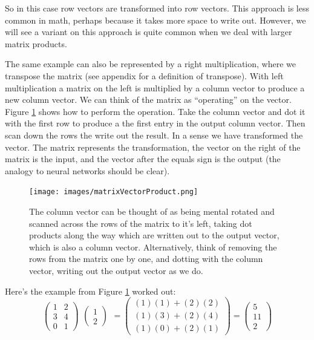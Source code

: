 So in this case row vectors are transformed into row vectors. This approach is less common in math, perhaps because it takes more space to write out. However, we will see a variant on this approach is quite common when we deal with larger matrix products.

The same example can also be represented by a right multiplication, where we transpose the matrix (see appendix for a definition of transpose). With left multiplication  a matrix on the left is multiplied by a column vector to produce a new column vector. We can think of the matrix as ``operating'' on the vector. Figure \ref{matrixVectorProduct} shows how to perform the operation. Take the column vector and dot it with the first row to produce a the first entry in the output column vector. Then scan down the rows the write out the result. In a sense we have transformed the vector. The matrix represents the transformation, the vector on the right of the matrix is the input, and the vector after the equals sign is the output (the analogy to neural networks should be clear).

\begin{figure}[h]
\centering
\texttt{[image: images/matrixVectorProduct.png]}
\caption[Jeff Yoshimi.]{The column vector can be thought of as being mental rotated and scanned across the rows of the matrix to it's left, taking dot products along the way which are written out to the output vector, which is also a column vector. Alternatively, think of removing the rows from the matrix one by one, and dotting with the column vector, writing out the output vector as we do.}
\label{matrixVectorProduct}
\end{figure}

Here's the example from Figure \ref{matrixVectorProduct} worked out:
\[
  \begin{pmatrix}
    1 & 2 \\
    3 & 4 \\
    0 & 1
  \end{pmatrix}
    \begin{matrix}
    \begin{pmatrix}1\\2\end{pmatrix}
  \end{matrix}
  =
  \begin{pmatrix}
    (1)(1) + (2)(2) \\
    (1)(3) + (2)(4) \\
    (1)(0) + (2)(1)
  \end{pmatrix}
  =
  \begin{pmatrix}
    5 \\
    11 \\
    2
  \end{pmatrix}
\]
\vspace*{.1cm}


